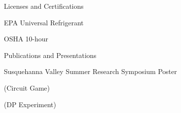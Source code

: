 \documentclass{resume} %
\newcommand{\tab}[1]{\hspace{.2667\textwidth}\rlap{#1}}
\newcommand{\itab}[1]{\hspace{0em}\rlap{#1}}
\begin{document}
\begin{rSection}{Licenses and Certifications} \itemsep -2pt
\item EPA Universal Refrigerant
\item OSHA 10-hour

\end{rSection}


\begin{rSection}{Publications and Presentations} \itemsep -2pt
\item Susquehanna Valley Summer Research Symposium Poster
\item (Circuit Game)
\item (DP Experiment)

\end{rSection}

\iffalse
\begin{rSection}{Relevant Courses}
\itab{\textbf{Core Courses}} \tab{}  \tab{\textbf{Other Courses}}
\\ \itab{Discrete Structures} \tab{}  \tab{Computer Organization \& Programming}
\\ \itab{Calculus III} \tab{}  \tab{Operating Systems} 
\\ \itab{Algorithms} \tab{}  \tab{Logic} 
\\ \itab{Life, Computers \& Everything} \tab{} \tab{Linear Algebra}
\\ \itab{Software Engineering and Design} \tab{} \tab{Cognitive Science (Audit)}

\end{rSection}
\fi
\end{document}
